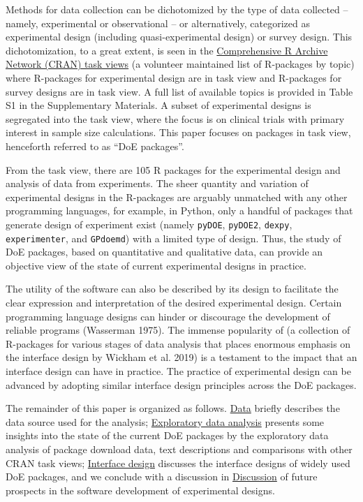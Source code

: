 Methods for data collection can be dichotomized by the type of data collected -- namely, experimental or observational -- or alternatively, categorized as experimental design (including quasi-experimental design) or survey design. This dichotomization, to a great extent, is seen in the \href{https://cran.r-project.org/web/views/}{Comprehensive R Archive Network (CRAN) task views} (a volunteer maintained list of R-packages by topic) where R-packages for experimental design are in  task view and R-packages for survey designs are in  task view. A full list of available topics is provided in Table S1 in the Supplementary Materials. A subset of experimental designs is segregated into the  task view, where the focus is on clinical trials with primary interest in sample size calculations. This paper focuses on packages in  task view, henceforth referred to as ``DoE packages''.

From the  task view, there are 105 R packages for the experimental design and analysis of data from experiments. The sheer quantity and variation of experimental designs in the R-packages are arguably unmatched with any other programming languages, for example, in Python, only a handful of packages that generate design of experiment exist (namely \texttt{pyDOE}, \texttt{pyDOE2}, \texttt{dexpy}, \texttt{experimenter}, and \texttt{GPdoemd}) with a limited type of design. Thus, the study of DoE packages, based on quantitative and qualitative data, can provide an objective view of the state of current experimental designs in practice.

The utility of the software can also be described by its design to facilitate the clear expression and interpretation of the desired experimental design. Certain programming language designs can hinder or discourage the development of reliable programs (Wasserman 1975). The immense popularity of  (a collection of R-packages for various stages of data analysis that places enormous emphasis on the interface design by Wickham et al. 2019) is a testament to the impact that an interface design can have in practice. The practice of experimental design can be advanced by adopting similar interface design principles across the DoE packages.

The remainder of this paper is organized as follows. \hyperref[data]{Data} briefly describes the data source used for the analysis; \hyperref[eda]{Exploratory data analysis} presents some insights into the state of the current DoE packages by the exploratory data analysis of package download data, text descriptions and comparisons with other CRAN task views; \hyperref[design]{Interface design} discusses the interface designs of widely used DoE packages, and we conclude with a discussion in \hyperref[discussion]{Discussion} of future prospects in the software development of experimental designs.

